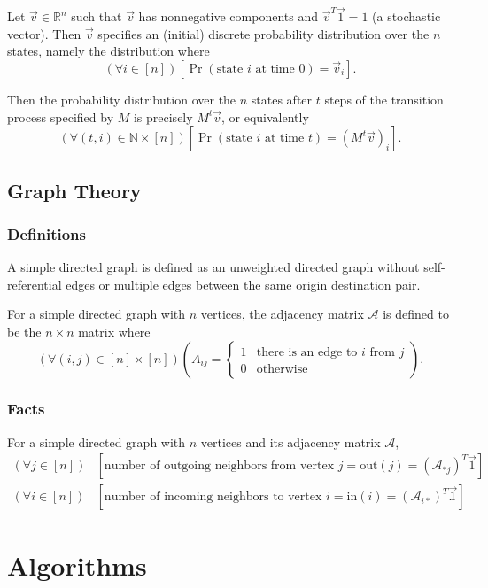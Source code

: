 \documentclass[12pt, titlepage, twoside]{amsart}
\newcommand{\R}{\ensuremath{\mathbb R}}
\newcommand{\N}{\ensuremath{\mathbb N}}
\begin{document}
Let $\vec{v}\in\R^n$ such that $\vec{v}$ has nonnegative components and $\vec{v}^T\vec{1} = 1$ (a stochastic vector).
Then $\vec{v}$ specifies an (initial) discrete probability distribution over the $n$ states, namely the distribution where
\[
  (\forall i\in[n])
  [\Pr(\text{state }i\text{ at time }0) = \vec{v}_i].
\]

Then the probability distribution over the $n$ states after $t$ steps of the transition process specified by $M$ is precisely $M^t\vec{v}$,
or equivalently
\[
  (\forall (t, i)\in\N\times[n])
  \left[\Pr(\text{state }i\text{ at time }t) = \left(M^t\vec{v}\right)_i\right].
\]

\subsection{Graph Theory}

\subsubsection{Definitions}

A simple directed graph is defined as an unweighted directed graph without self-referential edges or multiple edges
between the same origin destination pair.

For a simple directed graph with $n$ vertices, the adjacency matrix $\mathcal{A}$ is defined to be
the $n\times n$ matrix where
\[
  (\forall (i, j)\in[n]\times[n])\left(A_{ij} = 
    \begin{cases}
      1 & \text{there is an edge to $i$ from $j$} \\
      0 & \text{otherwise}
    \end{cases}
  \right).
\]

\subsubsection{Facts}

For a simple directed graph with $n$ vertices and its adjacency matrix $\mathcal{A}$,
\begin{align*}
  (\forall j\in[n])&
  \left[\text{number of outgoing neighbors from vertex $j$} = \mathrm{out}(j) = (\mathcal{A}_{*j})^T\vec{1}\right] \\
  (\forall i\in[n])&
  \left[\text{number of incoming neighbors to vertex $i$} = \mathrm{in}(i) = (\mathcal{A}_{i*})^T\vec{1}\right].
\end{align*}

\section{Algorithms}
\end{document}
